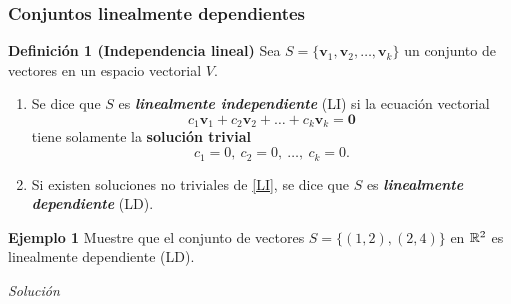 {\nologo
\begin{frame}\frametitle{Conjuntos linealmente dependientes}

\vspace{-2mm}
\begin{block}{\textbf{Definición 1 (Independencia lineal)}}
	\justifying
	Sea $S=\{\mathbf{v}_1,\mathbf{v}_2,\hdots,\mathbf{v}_k\}$ un conjunto de vectores
	en un espacio vectorial $V$.
	
	\begin{enumerate}%
		\item[\labelname{$a$}] Se dice que $S$ es \textbf{\textit{linealmente independiente}} (LI) si
		la ecuación vectorial
		\begin{equation}\tag{1}
		c_1\mathbf{v}_1+c_2\mathbf{v}_2+\hdots+c_k\mathbf{v}_k = \mathbf{0}
		\end{equation}
		tiene solamente la \textbf{solución trivial}
		\[
		c_1 =0,\ c_2 =0,\ \hdots,\ c_k=0.
		\]
		
		\item[\labelname{$b$}] Si existen soluciones no triviales de \eqref{LI}, se dice que $S$ es \textbf{\textit{linealmente dependiente}} (LD).
	\end{enumerate}		
\end{block}

\begin{ej}{\textbf{Ejemplo 1}} \justifying
Muestre que el conjunto de vectores $S=\{ (1,2), (2,4) \}$ en $\mathbb{R}^2$ es linealmente dependiente (LD).
\end{ej}	
\textit{Solución}

\end{frame}
}


\subsection{}

